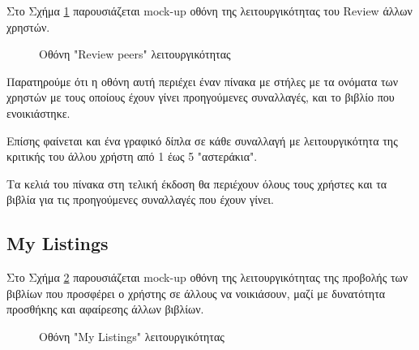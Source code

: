 \documentclass[12pt,a4paper]{article}
\begin{document}
Στο Σχήμα \ref{Οθόνη "Review peers" λειτουργικότητας} παρουσιάζεται mock-up οθόνη της λειτουργικότητας του Review άλλων χρηστών.

\begin{figure}[H]
	\caption{Οθόνη "Review peers" λειτουργικότητας}
	\label{Οθόνη "Review peers" λειτουργικότητας}
\end{figure}

Παρατηρούμε ότι η οθόνη αυτή περιέχει έναν πίνακα με στήλες με τα ονόματα των χρηστών με τους οποίους έχουν γίνει προηγούμενες συναλλαγές, και το βιβλίο που ενοικιάστηκε.

Επίσης φαίνεται και ένα γραφικό δίπλα σε κάθε συναλλαγή με λειτουργικότητα της κριτικής του άλλου χρήστη από 1 έως 5 "αστεράκια".

Τα κελιά του πίνακα στη τελική έκδοση θα περιέχουν όλους τους χρήστες και τα βιβλία για τις προηγούμενες συναλλαγές που έχουν γίνει.

\subsection{My Listings}

Στο Σχήμα \ref{Οθόνη "My Listings" λειτουργικότητας} παρουσιάζεται mock-up οθόνη της λειτουργικότητας της προβολής των βιβλίων που προσφέρει ο χρήστης σε άλλους να νοικιάσουν, μαζί με δυνατότητα προσθήκης και αφαίρεσης άλλων βιβλίων.

\begin{figure}[H]
	\caption{Οθόνη "My Listings" λειτουργικότητας}
	\label{Οθόνη "My Listings" λειτουργικότητας}
\end{figure}
\end{document}
